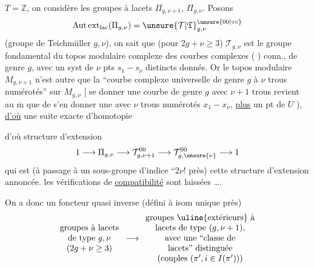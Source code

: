  \(T=\mathbb Z\), on considère les groupes à lacets  \(\Pi_{g,\nu+1}\), \(\Pi_{g,\nu}\). Posons
\[
\operatorname{Aut\,ext}_{\mathrm{lac}}(\Pi_{g,\nu})
=\unsure{\mathcal T|\mathfrak T}_{g,\nu}^{\unsure{00|\circ\circ}}
\]
(groupe de Teichmüller  \(g,\nu\)),
on sait que (pour \(2g+\nu\ge3\)) \(\mathcal T_{g,\nu}\) est le groupe fondamental du topos modulaire complexe  des courbes complexes ( ) conn., de genre \(g\), avec un syst de \(\nu\) pts \(s_1-\!s_\nu\) distincts donnés.
Or le topos modulaire \(M_{g,\nu+1}\) n'est autre que  la ``courbe complexe universelle  de genre \(g\) à \(\nu\) trous numérotés'' sur \(M_{g,\nu}\)
[ se donner une courbe  de genre \(g\) avec \(\nu+1\) trous  revient au \(\overline{\mathrm m}\) que de s'en donner une  avec \(\nu\) trous numérotés \(x_1-\!x_\nu\), \uline{plus} un  pt de \(U\) ), \uline{d'où} une suite exacte d'homotopie


d'où  structure d'extension 
\[
1\longrightarrow\Pi_{g,\nu}
\longrightarrow\mathcal T^{00}_{g,\nu+1}
\longrightarrow\mathcal T^{00}_{g,\unsure{\nu}}
\longrightarrow1
\]
qui est (à passage à un sous-groupe d'indice ``\(2\nu!\) près) cette structure d'extension annoncée. \unsure{\&} les vérifications de \uline{compatibilité} sont laissées \ldots.

On a donc un foncteur quasi inverse (défini à isom unique près)
\[
\begin{array}{c}
\text{groupes à lacets}\\
\text{de type }g,\nu\\
(2g+\nu\ge3)
\end{array}
\longrightarrow
\begin{array}{c}
\text{groupes \uline{extérieurs} à}\\
\text{lacets de type }(g,\nu+1),\\
\text{avec une ``classe de}\\
\text{lacets'' distinguée}\\
\text{(couples }(\pi',i\in I(\pi'))\text{)}
\end{array}
\]

